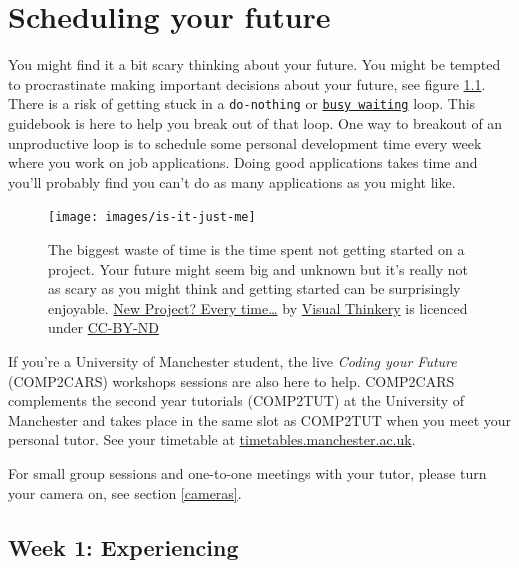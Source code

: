 \documentclass[
]{book}
\begin{document}
\hypertarget{scheduling}{%
\chapter{Scheduling your future}\label{scheduling}}

You might find it a bit scary thinking about your future. You might be tempted to procrastinate making important decisions about your future, see figure \ref{fig:schedule-fig}. There is a risk of getting stuck in a \texttt{do-nothing} or \href{https://en.wikipedia.org/wiki/Busy_waiting}{\texttt{busy\ waiting}} loop. This guidebook is here to help you break out of that loop. One way to breakout of an unproductive loop is to schedule some personal development time every week where you work on job applications. Doing good applications takes time and you'll probably find you can't do as many applications as you might like.

\begin{figure}

{\centering \texttt{[image: images/is-it-just-me]} 

}

\caption{The biggest waste of time is the time spent not getting started on a project. Your future might seem big and unknown but it's really not as scary as you might think and getting started can be surprisingly enjoyable. \href{https://bryanmmathers.com/new-project-every-time/}{New Project? Every time\ldots{}} by \href{https://visualthinkery.com/}{Visual Thinkery} is licenced under \href{https://creativecommons.org/licenses/by-nd/4.0/}{CC-BY-ND}}\label{fig:schedule-fig}
\end{figure}



If you're a University of Manchester student, the live \emph{Coding your Future} (COMP2CARS) workshops sessions are also here to help.
COMP2CARS complements the second year tutorials (COMP2TUT) at the University of Manchester and takes place in the same slot as COMP2TUT when you meet your personal tutor. See your timetable at \href{https://timetables.manchester.ac.uk/}{timetables.manchester.ac.uk}.

For small group sessions and one-to-one meetings with your tutor, please turn your camera on, see section \ref{cameras}.

\hypertarget{week1}{%
\section{Week 1: Experiencing}\label{week1}}
\end{document}
